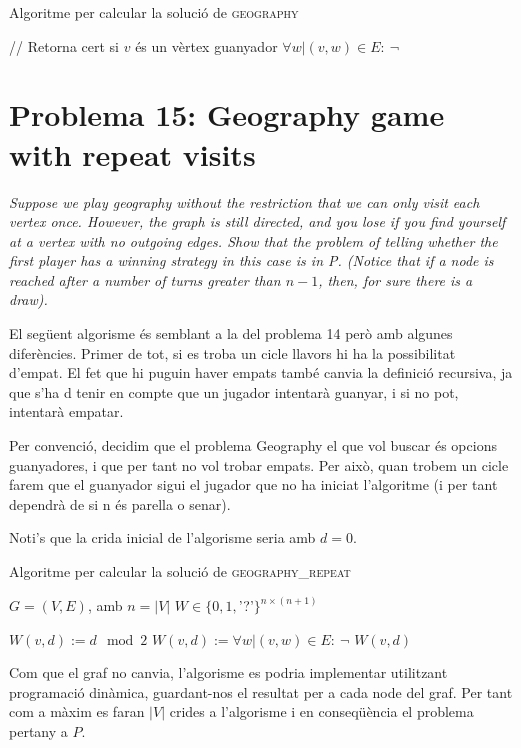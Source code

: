 \documentclass[a4paper]{article}
\begin{document}
\begin{algorithm}[H]
	\caption{Algoritme per calcular la solució de \textsc{geography}}
	\begin{algorithmic}[1]
		\State // Retorna cert si $v$ és un vèrtex guanyador
			\State \Return $\forall w | (v,w) \in E : \ \neg$ 
		\EndFunction
	\end{algorithmic}
\end{algorithm}

\pagebreak
\section{Problema 15: Geography game with repeat visits}
\emph{Suppose we play geography without the restriction that we can only visit each vertex once. However, the graph is still directed, and you lose if you find yourself at a vertex with no outgoing edges. Show that the problem of telling whether the first player has a winning strategy in this case is in P. (Notice that if a node is reached after a number of turns greater than $n − 1$, then, for sure there is a draw).}

El següent algorisme és semblant a la del problema 14 però amb algunes diferències. Primer de tot, si es troba un cicle llavors hi ha la possibilitat d'empat. El fet que hi puguin haver empats també canvia la definició recursiva, ja que s'ha d tenir en compte que un jugador intentarà guanyar, i si no pot, intentarà empatar.

Per convenció, decidim que el problema Geography el que vol buscar és opcions guanyadores, i que per tant no vol trobar empats. Per això, quan trobem un cicle farem que el guanyador sigui el jugador que no ha iniciat l'algoritme (i per tant dependrà de si n és parella o senar).

Noti's que la crida inicial de l'algorisme seria amb $d=0$.

\begin{algorithm}[H]
	\caption{Algoritme per calcular la solució de \textsc{geography\_repeat}}
	\begin{algorithmic}[1]
		\State $G = (V, E)$, amb $n = |V|$
		\State $W \in \{0,1,$'?'$\}^{n\times (n+1)}$

					\State $W(v,d) := d \mod 2$
				\Else
					\State $W(v,d) := \forall w | (v,w) \in E : \ \neg$ 
				\EndIf
			\EndIf
			\State \Return $W(v,d)$
		\EndFunction
	\end{algorithmic}
\end{algorithm}

Com que el graf no canvia, l'algorisme es podria implementar utilitzant programació dinàmica, guardant-nos el resultat per a cada node del graf. Per tant com a màxim es faran $|V|$ crides a l'algorisme i en conseqüència el problema pertany a $P$.
\end{document}

